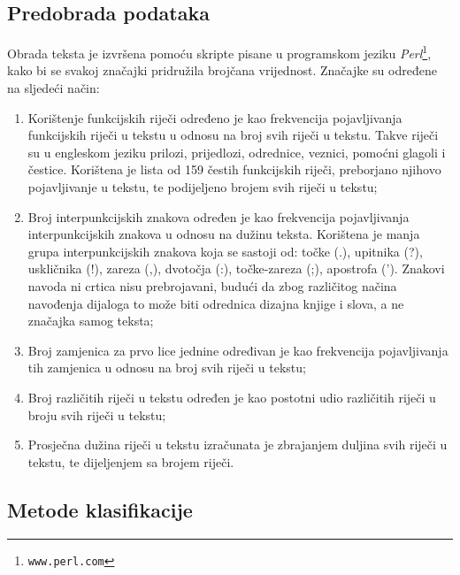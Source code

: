\documentclass[10pt, a4paper]{article}
\begin{document}



\subsection{Predobrada podataka}
Obrada teksta je izvršena pomoću skripte pisane u programskom jeziku \emph{Perl}\footnote{\texttt{www.perl.com}}, kako bi se svakoj značajki pridružila brojčana vrijednost. Značajke su određene na sljedeći način:
\begin{enumerate}
\item Korištenje funkcijskih riječi određeno je kao frekvencija pojavljivanja funkcijskih riječi u tekstu u odnosu na broj svih riječi u tekstu. Takve riječi su u engleskom jeziku prilozi, prijedlozi, odrednice, veznici, pomoćni glagoli i čestice. Korištena je lista od 159 čestih funkcijskih riječi, preborjano njihovo pojavljivanje u tekstu, te podijeljeno brojem svih riječi u tekstu;
\item Broj interpunkcijskih znakova određen je kao frekvencija pojavljivanja interpunkcijskih znakova u odnosu na dužinu teksta. Korištena je manja grupa interpunkcijskih znakova koja se sastoji od: točke (.), upitnika (?), uskličnika (!), zareza (,), dvotočja (:), točke-zareza (;), apostrofa ('). Znakovi navoda ni crtica nisu prebrojavani, budući da zbog različitog načina navođenja dijaloga to može biti odrednica dizajna knjige i slova, a ne značajka samog teksta;
\item Broj zamjenica za prvo lice jednine određivan je kao frekvencija pojavljivanja tih zamjenica u odnosu na broj svih riječi u tekstu;
\item Broj različitih riječi u tekstu određen je kao postotni udio različitih riječi u broju svih riječi u tekstu;
\item Prosječna dužina riječi u tekstu izračunata je zbrajanjem duljina svih riječi u tekstu, te dijeljenjem sa brojem riječi.
\end{enumerate}


\subsection{Metode klasifikacije}
\end{document}
